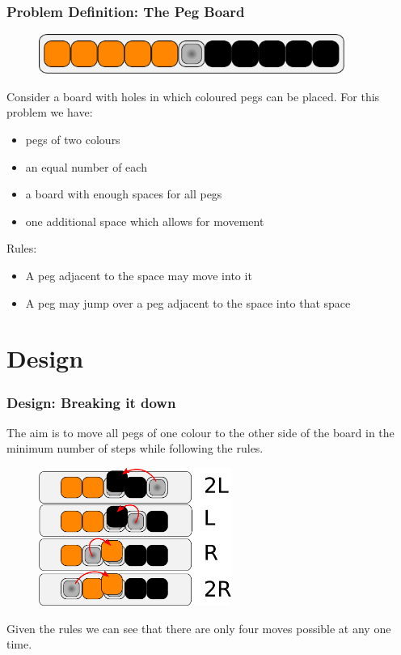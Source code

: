 \documentclass{beamer}
\begin{document}
	\begin{frame}
		\frametitle{Problem Definition: The Peg Board}
		\begin{figure}
		\includegraphics[width=10cm]{pegboardlayout}
		\end{figure}
		Consider a board with holes in which coloured pegs can be placed. For this problem we have: 
		\begin{itemize}
			\item pegs of two colours
			\item an equal number of each
			\item a board with enough spaces for all pegs
			\item one additional space which allows for movement
		\end{itemize}
		Rules:
		\begin{itemize}
			\item A peg adjacent to the space may move into it
			\item A peg may jump over a peg adjacent to the space into that space
		\end{itemize}	
		
	\end{frame}
		
\section{Design}
	\begin{frame}
		\frametitle{Design: Breaking it down}
		The aim is to move all pegs of one colour to the other side of the board in the minimum number of steps
		while following the rules.
		
		\begin{figure}
		\includegraphics[height=4.5cm]{pegboardmoves}
		\end{figure}
		
		Given the rules we can see that there are only four moves possible at any one time. 
		
		
	\end{frame}
	
\end{document}
